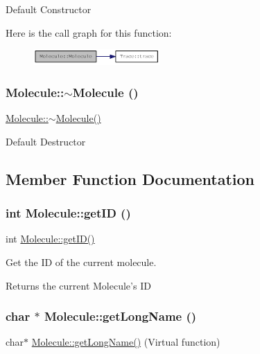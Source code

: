 Default Constructor 

Here is the call graph for this function:\nopagebreak
\begin{figure}[H]
\begin{center}
\leavevmode
\includegraphics[width=137pt]{classMolecule_a7e7d290ae641518ad4c4d5303b519d0f_cgraph}
\end{center}
\end{figure}
\hypertarget{classMolecule_a1ff980b574a62526abff3d631c83bf94}{
\subsubsection[{$\sim$Molecule}]{\setlength{\rightskip}{0pt plus 5cm}Molecule::$\sim$Molecule ()}}
\label{classMolecule_a1ff980b574a62526abff3d631c83bf94}
\hyperlink{classMolecule_a1ff980b574a62526abff3d631c83bf94}{Molecule::$\sim$Molecule()}

Default Destructor 

\subsection{Member Function Documentation}
\hypertarget{classMolecule_a9a596dbbdced6d8cec10ad158d4a9f2a}{
\subsubsection[{getID}]{\setlength{\rightskip}{0pt plus 5cm}int Molecule::getID ()}}
\label{classMolecule_a9a596dbbdced6d8cec10ad158d4a9f2a}
int \hyperlink{classMolecule_a9a596dbbdced6d8cec10ad158d4a9f2a}{Molecule::getID()}

Get the ID of the current molecule.

\begin{DoxyReturn}{Returns}
the current Molecule's ID 
\end{DoxyReturn}
\hypertarget{classMolecule_a6d3c3fd4827a62dacfd9d7a7d3a7f6ea}{
\subsubsection[{getLongName}]{\setlength{\rightskip}{0pt plus 5cm}char $\ast$ Molecule::getLongName ()}}
\label{classMolecule_a6d3c3fd4827a62dacfd9d7a7d3a7f6ea}
char$\ast$ \hyperlink{classMolecule_a6d3c3fd4827a62dacfd9d7a7d3a7f6ea}{Molecule::getLongName()} (Virtual function)

